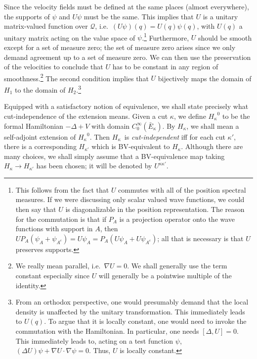 \documentclass[11pt]{article}
\theoremstyle{remark}
\begin{document}
Since the velocity fields must be defined at the same places (almost
everywhere), the supports of $\ensuremath{\psi}$ and $U \ensuremath{\psi}$ must be
the same. This implies that $U$ is a unitary matrix-valued function over
\ensuremath{\mathcal{Q}}, i.e.\ $(U \ensuremath{\psi}) (\ensuremath{q})  = U(\ensuremath{q}) \ensuremath{\psi}(\ensuremath{q}) $, with $U(\ensuremath{q})$ a
unitary matrix acting on the value space of \ensuremath{\psi}.\footnote{This follows
from the fact that $U$ commutes with all of the position spectral
measures. If we were discussing only scalar valued wave functions, we could 
then say that $U$ is diagonalizable in the position
representation. The reason for the commutation is that if $P_A$ is a
projection operator onto the wave functions with support in $A$, then $U P_A
(\ensuremath{\psi}_A + \ensuremath{\psi}_{A^c}) = U \ensuremath{\psi}_A  = P_A( U\ensuremath{\psi}_A + U\ensuremath{\psi}_{A^c})$; all that
is necessary is that $U$ preserves supports.}
Furthermore, $U$
should be smooth except for a set of measure zero; the set of measure zero
arises since we only demand agreement up to a set of measure zero. We can
then use the 
preservation of the velocities to conclude that $U$ has to be 
constant 
in any region of smoothness.\footnote{We really mean parallel, i.e.\ $\nabla U =0$.  
We shall generally use the term constant especially since $U$ will
generally 
be a pointwise 
multiple of the identity.} 
The second condition implies that $U$ bijectively maps
the domain of $H_1$ to the domain of $H_2$.\footnote{From an orthodox
perspective, one would presumably demand that the local density is
unaffected by the unitary transformation. This immediately leads to
$U(q)$. To argue that it is locally constant, one would need to invoke
the commutation with the Hamiltonian. In particular, one needs 
$[\ensuremath{\Delta}, U] =0$. This immediately leads to, acting on a test function
\ensuremath{\psi}, $(\ensuremath{\Delta} U) \ensuremath{\psi} + \nabla U \cdot \nabla \ensuremath{\psi} = 0$. Thus, $U$ is
locally constant.}

Equipped with a satisfactory notion of equivalence, we shall state
precisely what  cut-independence of the extension means.
Given a cut \ensuremath{\kappa}, we define $\ensuremath{H_{\ensuremath{\kappa}}}^{0}$ to be the formal Hamiltonian 
 $ -\ensuremath{\Delta} +V$  with domain 
$\ensuremath{C^{\infty}_0}(\ensuremath{\bar{E}_{\ensuremath{\kappa}}})$. By $\ensuremath{H_{\ensuremath{\kappa}}}$, we shall mean a self-adjoint extension 
of $\ensuremath{H_{\ensuremath{\kappa}}}^{0}$. 
Then  \ensuremath{H_{\ensuremath{\kappa}}}\ is
\emph{cut-independent} iff for each cut \ensuremath{\kappa'}, there is a
corresponding $\ensuremath{H_{\ensuremath{\kappa'}}}$  which is BV-equivalent to \ensuremath{H_{\ensuremath{\kappa}}}. 
Although there are many choices, we shall simply assume that 
a 
BV-equivalence map taking $\ensuremath{H_{\ensuremath{\kappa}}} \to \ensuremath{H_{\ensuremath{\kappa'}}}$
 has
been chosen; it will be 
denoted by
\ensuremath{U^{\ensuremath{\kappa}{}  \ensuremath{\kappa}{'}}}. 
\end{document}
